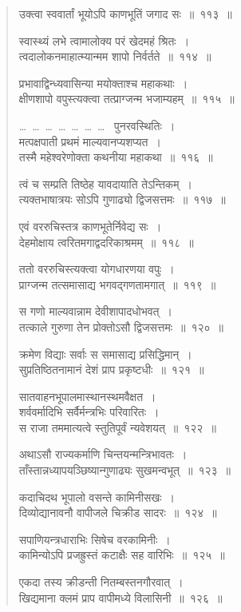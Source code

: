 \documentclass[11pt, openany]{book}
\begin{document}
\begin{multicols}{2}
\begin{quote}
{\mbh उक्त्वा स्ववार्तां भूयोऽपि काणभूतिं जगाद सः~॥~११३~॥

स्वास्थ्यं लभे त्वामालोक्य परं खेदमहं श्रितः~।\\
त्वदालोकनमाहात्म्यान्मम शापो निर्वर्तते~॥~११४~॥

प्रभावाद्विन्ध्यवासिन्या मयोक्ताश्च महाकथाः~।\\
क्षीणशापो वपुस्त्यक्त्वा तत्प्राग्जन्म भजाम्यहम्~॥~११५~॥

\ldots~\ldots~\ldots~\ldots~\ldots~\ldots~\ldots~ पुनरवस्थितिः~।\\

मत्पक्षपाती प्रथमं माल्यवानप्यशप्यत~।\\
तस्मै महेश्वरेणोक्ता कथनीया महाकथा~॥~११६~॥

त्वं च सम्प्रति तिष्ठेह यावदायाति तेऽन्तिकम्~।\\
त्यक्तभाषात्रयः सोऽपि गुणाढ्यो द्विजसत्तमः~॥~११७~॥

एवं वररुचिस्तत्र काणभूतेर्निवेद्य सः~।\\
देहमोक्षाय त्वरितमगाद्वदरिकाश्रमम्~॥~११८~॥

ततो वररुचिस्त्यक्त्वा योगधारणया वपुः~।\\
प्राग्जन्म तत्समासाद्य भगवद्गणतामगात्~॥~११९~॥

स गणो माल्यवान्नाम देवीशापादधोभवत्~।\\
तत्काले गुरुणा तेन प्रोक्तोऽसौ द्विजसत्तमः~॥~१२०~॥

क्रमेण विद्याः सर्वाः स समासाद्य प्रसिद्धिमान्~।\\
सुप्रतिष्ठितनामानं देशं प्राप प्रकृष्टधीः~॥~१२१~॥

सातवाहनभूपालमास्थानस्थमवैक्षत~।\\
शर्ववर्मादिभि सर्वैर्मन्त्रभिः परिवारितः~।\\
स राजा तममात्यत्वे स्तुतिपूर्वं न्यवेशयत्~॥~१२२~॥

अथाऽसौ राज्यकर्माणि चिन्तयन्मन्त्रिभावतः~।\\
ताँस्तान्नध्यापयञ्छिष्यान्गुणाढ्यः सुखमन्वभूत्~॥~१२३~॥

कदाचिदथ भूपालो वसन्ते कामिनीसखः~।\\
दिव्योद्यानावनौ वापीजले चिक्रीड सादरः~॥~१२४~॥

सपाणियन्त्रधाराभिः सिषेच वरकामिनीः~।\\
कामिन्योऽपि प्रजह्रुस्तं कटाक्षैः सह वारिभिः~॥~१२५~॥

एकदा तस्य क्रीडन्ती नितम्बस्तनगौरवात्~।\\
खिद्यमाना क्लमं प्राप वापीमध्ये विलासिनी~॥~१२६~॥

}
\end{quote}
\end{multicols}
\end{document}
